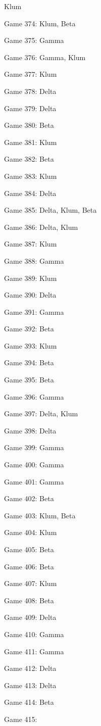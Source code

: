 \documentclass{article}
\begin{document}
\begin{multicols}{3}
\begin{compactitem}
Klum
\item Game 374:
Klum, Beta
\item Game 375:
Gamma
\item Game 376:
Gamma, Klum
\item Game 377:
Klum
\item Game 378:
Delta
\item Game 379:
Delta
\item Game 380:
Beta
\item Game 381:
Klum
\item Game 382:
Beta
\item Game 383:
Klum
\item Game 384:
Delta
\item Game 385:
Delta, Klum, Beta
\item Game 386:
Delta, Klum
\item Game 387:
Klum
\item Game 388:
Gamma
\item Game 389:
Klum
\item Game 390:
Delta
\item Game 391:
Gamma
\item Game 392:
Beta
\item Game 393:
Klum
\item Game 394:
Beta
\item Game 395:
Beta
\item Game 396:
Gamma
\item Game 397:
Delta, Klum
\item Game 398:
Delta
\item Game 399:
Gamma
\item Game 400:
Gamma
\item Game 401:
Gamma
\item Game 402:
Beta
\item Game 403:
Klum, Beta
\item Game 404:
Klum
\item Game 405:
Beta
\item Game 406:
Beta
\item Game 407:
Klum
\item Game 408:
Beta
\item Game 409:
Delta
\item Game 410:
Gamma
\item Game 411:
Gamma
\item Game 412:
Delta
\item Game 413:
Delta
\item Game 414:
Beta
\item Game 415:

\end{compactitem}
\end{multicols}
\end{document}
